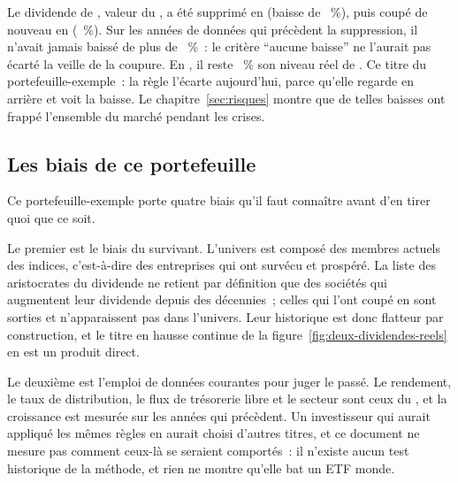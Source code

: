 Le dividende de \BeispielBaisse, valeur du \BeispielBaisseIndice, a \'et\'e supprim\'e en
\BeispielBaisseAnnee{} (baisse de \BeispielBaisseProzent~\%), puis coup\'e de nouveau en
\BeispielBaisseAutreAnnee{} (\BeispielBaisseAutreProzent~\%). Sur les \BeispielBaisseAnneesSansBaisse{}
ann\'ees de donn\'ees qui pr\'ec\`edent la suppression, il n'avait jamais baiss\'e de plus de
\RegleBaisseSeuil~\%~: le crit\`ere \enquote{aucune baisse} ne l'aurait pas \'ecart\'e la veille de la
coupure. En \BeispielBaisseDerniereAnnee, il reste \BeispielBaisseEcartFinProzent~\%
\BeispielBaisseEcartFinSens{} son niveau r\'eel de \BeispielBaisseAnneeAvant. Ce titre
\BeispielBaisseStatut{} du portefeuille-exemple~: la r\`egle l'\'ecarte aujourd'hui, parce qu'elle
regarde en arri\`ere et voit la baisse.  Le chapitre~\ref{sec:risques} montre que de telles
baisses ont frapp\'e l'ensemble du march\'e pendant les crises.

\subsection{Les biais de ce portefeuille}\label{sec:porte-biais}

Ce portefeuille-exemple porte quatre biais qu'il faut conna\^itre avant d'en tirer quoi que ce
soit.

Le premier est le biais du survivant. L'univers est compos\'e des membres actuels des indices,
c'est-\`a-dire des entreprises qui ont surv\'ecu et prosp\'er\'e. La liste des aristocrates du dividende
ne retient par d\'efinition que des soci\'et\'es qui augmentent leur dividende depuis des d\'ecennies~;
celles qui l'ont coup\'e en sont sorties et n'apparaissent pas dans l'univers. Leur historique est
donc flatteur par construction, et le titre en hausse continue de la
figure~\ref{fig:deux-dividendes-reels} en est un produit direct.

Le deuxi\`eme est l'emploi de donn\'ees courantes pour juger le pass\'e. Le rendement, le taux de
distribution, le flux de tr\'esorerie libre et le secteur sont ceux du \DateDonneesPortefeuille, et la
croissance est mesur\'ee sur les \RegleAnneesCroissance{} ann\'ees qui pr\'ec\`edent. Un investisseur
qui aurait appliqu\'e les m\^emes r\`egles en \DonneesDebut{} aurait choisi d'autres titres, et ce
document ne mesure pas comment ceux-l\`a se seraient comport\'es~: il n'existe aucun test historique
de la m\'ethode, et rien ne montre qu'elle bat un ETF monde.

